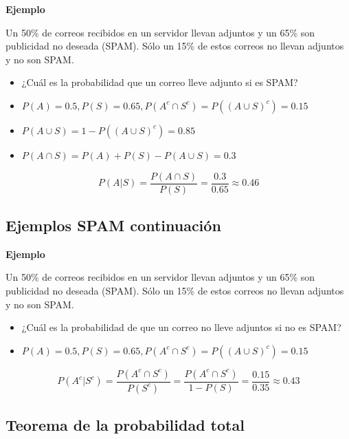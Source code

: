 \documentclass[]{book}
\providecommand{\tightlist}{%
  \setlength{\itemsep}{0pt}\setlength{\parskip}{0pt}}
\begin{document}
\textbf{Ejemplo}

Un 50\% de correos recibidos en un servidor llevan adjuntos y un 65\% son publicidad no deseada (SPAM). Sólo un 15\% de estos correos no llevan adjuntos y no son SPAM.

\begin{itemize}
\tightlist
\item
  ¿Cuál es la probabilidad que un correo lleve adjunto si es SPAM?
\end{itemize}

\begin{itemize}
\item
  \(P(A)=0.5, P(S)=0.65, P(A^c\cap S^c)=P((A\cup S)^c)=0.15\)
\item
  \(P(A\cup S)=1-P((A\cup S)^c)=0.85\)
\item
  \(P(A\cap S)=P(A)+P(S)-P(A\cup S)=0.3\)
\end{itemize}

\[P(A|S)=\dfrac{P(A\cap S)}{P(S)}=\dfrac{0.3}{0.65}\approx 0.46\]

\hypertarget{ejemplos-spam-continuaciuxf3n}{%
\subsection{Ejemplos SPAM continuación}\label{ejemplos-spam-continuaciuxf3n}}

\textbf{Ejemplo}

Un 50\% de correos recibidos en un servidor llevan adjuntos y un 65\% son publicidad no deseada (SPAM). Sólo un 15\% de estos correos no llevan adjuntos y no son SPAM.

\begin{itemize}
\tightlist
\item
  ¿Cuál es la probabilidad de que un correo no lleve adjuntos si no es SPAM?
\end{itemize}

\begin{itemize}
\tightlist
\item
  \(P(A)=0.5, P(S)=0.65, P(A^c\cap S^c)=P((A\cup S)^c)=0.15\)
\end{itemize}

\[P(A^c|S^c)=\dfrac{P(A^c\cap S^c)}{P(S^c)}=\dfrac{P(A^c\cap S^c)}{1-P(S)}=\dfrac{0.15}{0.35}\approx 0.43\]

\hypertarget{teorema-de-la-probabilidad-total}{%
\subsection{Teorema de la probabilidad total}\label{teorema-de-la-probabilidad-total}}
\end{document}
